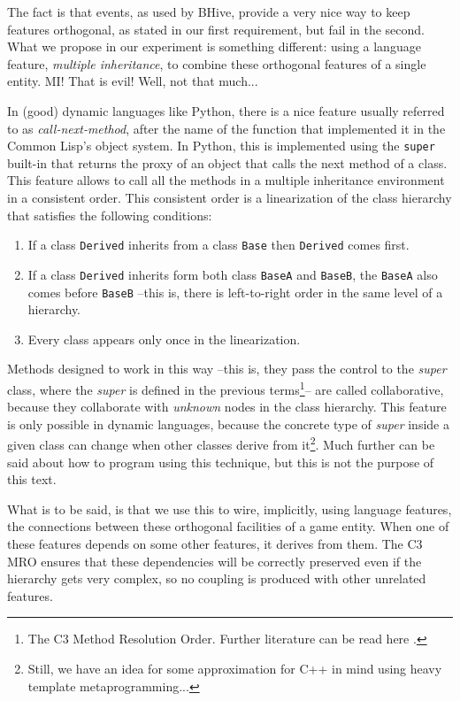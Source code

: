 \documentclass[a4paper,10pt]{article}
\begin{document}
The fact is that events, as used by BHive, provide a very nice way to
keep features orthogonal, as stated in our first requirement, but fail
in the second. What we propose in our experiment is something
different: using a language feature, \emph{multiple inheritance}, to
combine these orthogonal features of a single entity. MI! That is
evil! Well, not that much...

In (good) dynamic languages like Python, there is a nice feature
usually referred to as \emph{call-next-method}, after the name of the
function that implemented it in the Common Lisp's object system. In
Python, this is implemented using the \texttt{super} built-in that
returns the proxy of an object that calls the next method of a
class. This feature allows to call all the methods in a multiple
inheritance environment in a consistent order. This consistent order
is a linearization of the class hierarchy that satisfies the following
conditions:

\begin{enumerate}
\item If a class \texttt{Derived} inherits from a class \texttt{Base}
  then \texttt{Derived} comes first.
\item If a class \texttt{Derived} inherits form both class
  \texttt{BaseA} and \texttt{BaseB}, the \texttt{BaseA} also comes
  before \texttt{BaseB} --this is, there is left-to-right order in
  the same level of a hierarchy.
\item Every class appears only once in the linearization.
\end{enumerate}

Methods designed to work in this way --this is, they pass the control
to the \emph{super} class, where the \emph{super} is defined in the
previous terms\footnote{The C3 Method Resolution Order. Further
  literature can be read here \cite{pythonmro}\cite{barret96c3}.}--
are called collaborative, because they collaborate with \emph{unknown}
nodes in the class hierarchy. This feature is only possible in dynamic
languages, because the concrete type of \emph{super} inside a given
class can change when other classes derive from it\footnote{Still, we
  have an idea for some approximation for C++ in mind using heavy
  template metaprogramming...}. Much further can be said about how to
program using this technique, but this is not the purpose of this
text.

What is to be said, is that we use this to wire, implicitly, using
language features, the connections between these orthogonal
facilities of a game entity. When one of these features depends on some
other features, it derives from them. The C3 MRO ensures that these
dependencies will be correctly preserved even if the hierarchy gets
very complex, so no coupling is produced with other unrelated
features.
\end{document}
